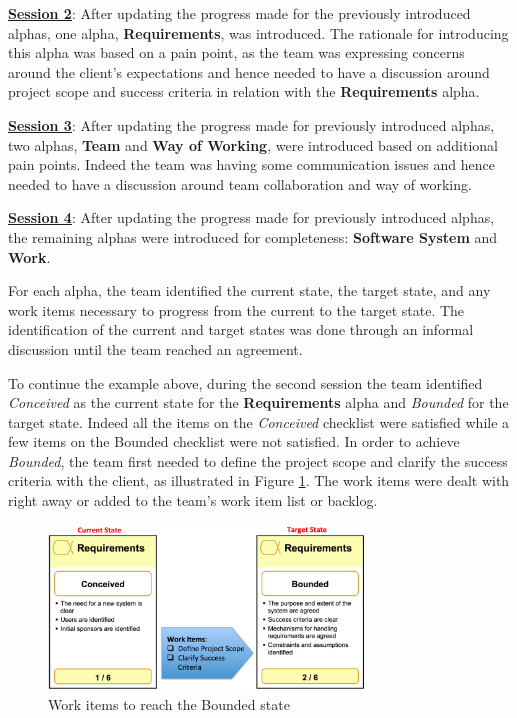 \underline{\textbf{Session 2}}: After updating the progress made for the previously introduced alphas, one  alpha, \textbf{Requirements}, was introduced. The rationale for introducing this alpha was based on a pain point, as the team was expressing concerns around the client's expectations and hence needed to have a discussion around project scope and success criteria in relation with the \textbf{Requirements} alpha.

\underline{\textbf{Session 3}}: After updating the progress made for previously introduced alphas, two  alphas, \textbf{Team} and \textbf{Way of Working}, were introduced based on additional pain points. Indeed the team was having some communication issues and hence needed to have a discussion around team collaboration and way of working.

\underline{\textbf{Session 4}}: After updating the progress made for previously introduced alphas, the remaining alphas were introduced for completeness: \textbf{Software System} and \textbf{Work}.

For each alpha, the team identified the current state, the target state, and any work items necessary to progress from the current to the target state. The identification of the current and target states was done through an informal discussion until the team reached an agreement.

To continue the example above, during the second session the team identified \textit{Conceived} as the current state for the \textbf{Requirements} alpha and \textit{Bounded} for the target state. Indeed all the items on the \textit{Conceived} checklist were satisfied while a few items on the Bounded checklist were not satisfied. In order to achieve \textit{Bounded}, the team first needed to define the project scope and clarify the success criteria with the client, as illustrated in Figure \ref{WorkItems}. The work items were dealt with right away or added to the team's work item list or backlog.

\begin{figure}[h]
\centering
\includegraphics[width=3.30in]{project_steering_images/WorkItems.png}
\caption{Work items to reach the Bounded state}
\label{WorkItems}
\end{figure}

